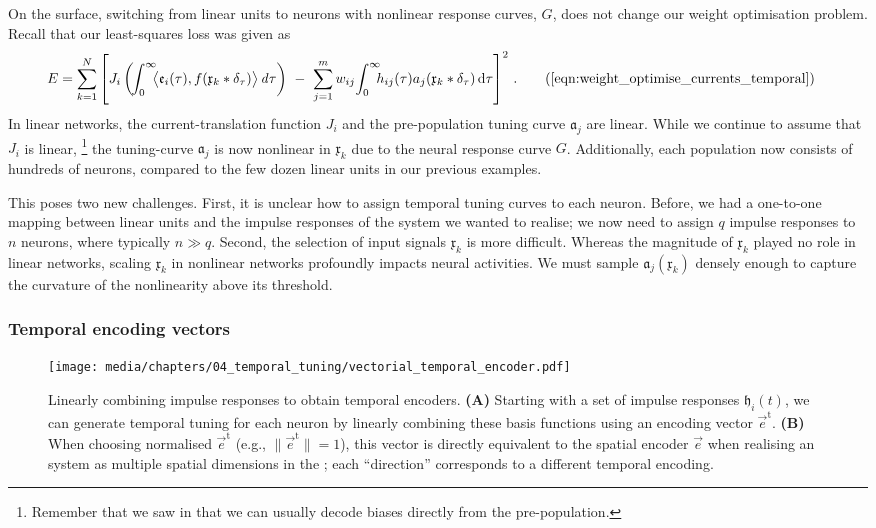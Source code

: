 On the surface, switching from linear units to neurons with nonlinear response curves, $G$, does not change our weight optimisation problem.
Recall that our least-squares loss was given as
\begin{align}
	E &= \sum_{k = 1}^N \left[
		J_i \left( \! \int_0^\infty \!\!\! \big\langle \mathfrak{e}_i(\tau), f(\mathfrak{x}_k \ast \delta_\tau) \big\rangle \, \mathit{d\tau} \right) \,\,-\,\,
		\sum_{j = 1}^m w_{ij} \! \int_0^\infty \!\!\! h_{ij}(\tau) a_j(\mathfrak{x}_k \ast \delta_\tau) \,\mathrm{d}\tau
	\right]^2 \,.
	\tag{\ref{eqn:weight_optimise_currents_temporal}}
\end{align}
In linear networks, the current-translation function $J_i$ and the pre-population tuning curve $\mathfrak{a}_j$ are linear.
While we continue to assume that $J_i$ is linear,%
\footnote{
Remember that we saw in  that we can usually decode biases directly from the pre-population.
}
the tuning-curve $\mathfrak{a}_j$ is now nonlinear in $\mathfrak{x}_k$ due to the neural response curve $G$.
Additionally, each population now consists of hundreds of neurons, compared to the few dozen linear units in our previous examples.

This poses two new challenges.
First, it is unclear how to assign temporal tuning curves to each neuron.
Before, we had a one-to-one mapping between linear units and the impulse responses of the \LTI system we wanted to realise; we now need to assign $q$ impulse responses to $n$ neurons, where typically $n \gg q$.
Second, the selection of input signals $\mathfrak{x}_k$ is more difficult.
Whereas the magnitude of $\mathfrak{x}_k$ played no role in linear networks, scaling $\mathfrak{x}_k$ in nonlinear networks profoundly impacts neural activities.
We must sample $\mathfrak{a}_j(\mathfrak{x}_k)$ densely enough to capture the curvature of the nonlinearity above its threshold.

\subsubsection{Temporal encoding vectors}

\begin{figure}
	\texttt{[image: media/chapters/04\_temporal\_tuning/vectorial\_temporal\_encoder.pdf]}
	\caption[Linearly combining impulse responses to obtain temporal encoders]{Linearly combining impulse responses to obtain temporal encoders. \textbf{(A)} Starting with a set of impulse responses $\mathfrak{h}_i(t)$, we can generate temporal tuning for each neuron by linearly combining these basis functions using an encoding vector $\vec{e}^\mathrm{t}$.
	\textbf{(B)} When choosing normalised $\vec{e}^\mathrm{t}$ (e.g., $\| \vec{e}^\mathrm{t} \| = 1$), this vector is directly equivalent to the spatial encoder $\vec e$ when realising an \LTI system as multiple spatial dimensions in the \NEF; each \enquote{direction} corresponds to a different temporal encoding.
	}
	\label{fig:vectorial_temporal_encoder}
\end{figure}

